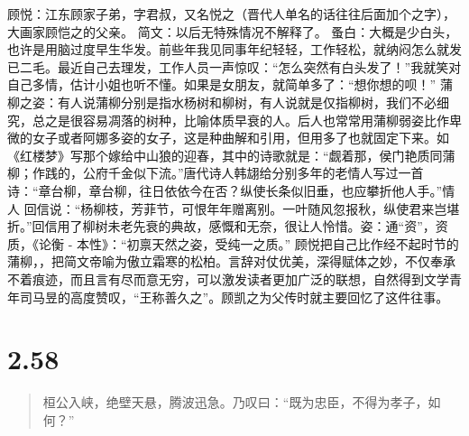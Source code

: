 \documentclass[]{book}
\begin{document}
顾悦：江东顾家子弟，字君叔，又名悦之（晋代人单名的话往往后面加个之字），大画家顾恺之的父亲。
简文：以后无特殊情况不解释了。
蚤白：大概是少白头，也许是用脑过度早生华发。前些年我见同事年纪轻轻，工作轻松，就纳闷怎么就发已二毛。最近自己去理发，工作人员一声惊叹：``怎么突然有白头发了！''我就笑对自己多情，估计小姐也听不懂。如果是女朋友，就简单多了：``想你想的呗！''
蒲柳之姿：有人说蒲柳分别是指水杨树和柳树，有人说就是仅指柳树，我们不必细究，总之是很容易凋落的树种，比喻体质早衰的人。后人也常常用蒲柳弱姿比作卑微的女子或者阿娜多姿的女子，这是种曲解和引用，但用多了也就固定下来。如《红楼梦》写那个嫁给中山狼的迎春，其中的诗歌就是：``觑着那，侯门艳质同蒲柳；作践的，公府千金似下流。''唐代诗人韩翃给分别多年的老情人写过一首诗：``章台柳，章台柳，往日依依今在否？纵使长条似旧垂，也应攀折他人手。''情人
回信说：``杨柳枝，芳菲节，可恨年年赠离别。一叶随风忽报秋，纵使君来岂堪折。''回信用了柳树未老先衰的典故，感慨和无奈，很让人怜惜。姿：通``资''，资
质，《论衡 - 本性》：``初禀天然之姿，受纯一之质。''
顾悦把自己比作经不起时节的蒲柳，，把简文帝喻为傲立霜寒的松柏。言辞对仗优美，深得赋体之妙，不仅奉承不着痕迹，而且言有尽而意无穷，可以激发读者更加广泛的联想，自然得到文学青年司马昱的高度赞叹，``王称善久之''。顾凯之为父传时就主要回忆了这件往事。

\section{2.58}\label{section-104}

\begin{quote}
桓公入峡，绝壁天悬，腾波迅急。乃叹曰：``既为忠臣，不得为孝子，如何？''
\end{quote}
\end{document}
